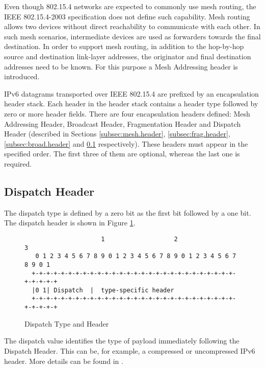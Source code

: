 \documentclass[12pt, titlepage, a4paper]{report}
\newenvironment{mylisting}
{\begin{list}{}{\setlength{\leftmargin}{1em}}\item\footnotesize}
{\end{list}}
\begin{document}
Even though 802.15.4 networks are expected to commonly use mesh routing, the IEEE 802.15.4-2003 \cite{ieee802.15.4} specification does not define such capability. Mesh routing allows two devices  without direct reachability to communicate with each other. In such mesh scenarios, intermediate devices are used as forwarders towards the final destination. In order to support mesh routing, in addition to the hop-by-hop source and destination link-layer addresses, the originator and final destination addresses need to be known. For this purpose a Mesh Addressing header is introduced.


IPv6 datagrams transported over IEEE 802.15.4 are prefixed by an encapsulation header stack. Each header in the header stack contains a header type followed by zero or more header fields.  There are four encapsulation headers defined: Mesh Addressing Header, Broadcast Header, Fragmentation Header and Dispatch Header (described in Sections \ref{subsec:mesh.header}, \ref{subsec:frag.header},\ref{subsec:broad.header} and \ref{subsec:dispatch.header} respectively). These headers must appear in the specified order. The first three of them are optional, whereas the last one is required.

\subsection{Dispatch Header}\label{subsec:dispatch.header}
The dispatch type is defined by a zero bit as the first bit followed by a one bit. The dispatch header is shown in Figure \ref{fig:dispatch.header}.

\begin{figure}[htp]
\centering
\begin{mylisting}
\begin{verbatim}
                     1                   2                   3
   0 1 2 3 4 5 6 7 8 9 0 1 2 3 4 5 6 7 8 9 0 1 2 3 4 5 6 7 8 9 0 1
  +-+-+-+-+-+-+-+-+-+-+-+-+-+-+-+-+-+-+-+-+-+-+-+-+-+-+-+-+-+-+-+-+
  |0 1| Dispatch  |  type-specific header
  +-+-+-+-+-+-+-+-+-+-+-+-+-+-+-+-+-+-+-+-+-+-+-+-+-+-+-+-+-+-+-+-+
\end{verbatim}
\end{mylisting}
\caption{Dispatch Type and Header}\label{fig:dispatch.header}
\end{figure}
The dispatch value identifies the type of payload immediately following the Dispatch Header. This can  be, for example, a compressed or uncompressed IPv6 header. More details can be found in \cite{rfc4944}.
\end{document}
